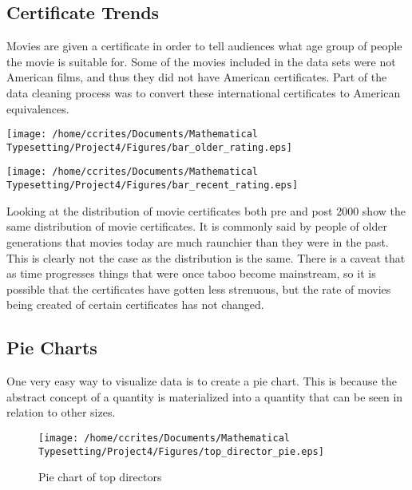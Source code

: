 \documentclass[10pt]{article}
\begin{document}
\subsection*{Certificate Trends}
Movies are given a certificate in order to tell audiences what age group of people the movie is suitable for. Some of the movies included in the data sets were not American films, and thus they did not have American certificates. Part of the data cleaning process was to convert these international certificates to American equivalences. 

\begin{minipage}[l]{0.45\linewidth}
	\texttt{[image: /home/ccrites/Documents/Mathematical Typesetting/Project4/Figures/bar\_older\_rating.eps]}
	\label{fig:fig6}
\end{minipage}
\begin{minipage}[r]{0.45\linewidth}
	\texttt{[image: /home/ccrites/Documents/Mathematical Typesetting/Project4/Figures/bar\_recent\_rating.eps]}
	\label{fig:fig7}
\end{minipage}
\medskip
\par Looking at the distribution of movie certificates both pre and post 2000 show the same distribution of movie certificates. It is commonly said by people of older generations that movies today are much raunchier than they were in the past. This is clearly not the case as the distribution is the same. There is a caveat that as time progresses things that were once taboo become mainstream, so it is possible that the certificates have gotten less strenuous, but the rate of movies being created of certain certificates has not changed.

\subsection*{Pie Charts}
\par One very easy way to visualize data is to create a pie chart. This is because the abstract concept of a quantity is materialized into a quantity that can be seen in relation to other sizes. \\
\begin{wrapfigure}{l}{0.45\linewidth}
	\texttt{[image: /home/ccrites/Documents/Mathematical Typesetting/Project4/Figures/top\_director\_pie.eps]}
	\caption{\label{fig8} Pie chart of top directors}
\end{wrapfigure}
\end{document}
